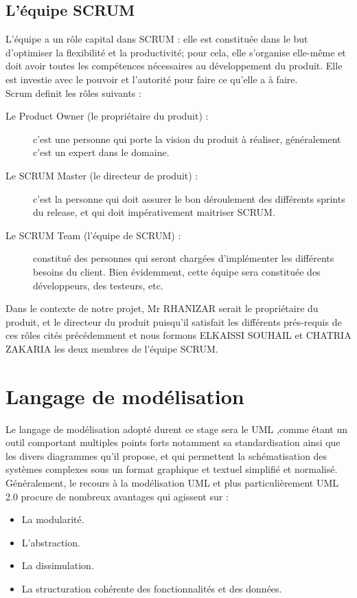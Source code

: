 \subsection{L'équipe SCRUM}
L’équipe a un rôle capital dans SCRUM : elle est constituée dans le but d’optimiser la flexibilité et la productivité; pour cela, elle s’organise elle-même et doit avoir toutes les compétences nécessaires au développement du produit. Elle est investie avec le pouvoir et l’autorité pour faire ce qu’elle a à faire.\\[0.5cm]
Scrum definit les rôles suivants :
\begin{description}
\item[Le Product Owner (le propriétaire du produit) : ] c’est une personne qui porte la vision du produit à réaliser, généralement c’est un expert dans le domaine.
\item[Le SCRUM Master (le directeur de produit) : ]c'est la personne qui doit assurer le bon déroulement des différents sprints du release, et qui doit impérativement maitriser SCRUM. 
\item[Le SCRUM Team (l’équipe de SCRUM) : ] constitué des personnes qui seront chargées d’implémenter les différents besoins du client. Bien évidemment, cette équipe sera constituée des développeurs, des testeurs, etc.
\end{description}
Dans le contexte de notre projet, Mr RHANIZAR serait  le propriétaire du produit, et le directeur du produit puisqu’il satisfait les différents prés-requis de ces rôles cités précédemment et nous formons ELKAISSI SOUHAIL et CHATRIA ZAKARIA les deux membres de l’équipe SCRUM. 
\section{Langage de modélisation}
Le langage de modélisation adopté durent ce stage sera le UML ,comme étant un outil comportant multiples points forts notamment sa standardisation ainsi que les divers diagrammes qu’il propose, et qui permettent la schématisation des systèmes complexes sous un format graphique et textuel simplifié et normalisé.\\
Généralement, le recours à la modélisation UML et plus particulièrement UML 2.0 procure de nombreux avantages qui agissent sur :
\begin{itemize}
\item La modularité.
\item L’abstraction.
\item La dissimulation.
\item La structuration cohérente des fonctionnalités et des données.
\end{itemize}
